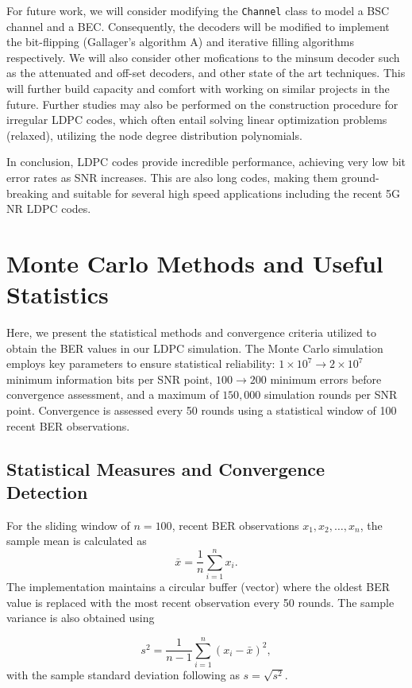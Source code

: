 \documentclass[12pt]{scrreprt}
\begin{document}
	For future work, we will consider modifying the \verb|Channel| class to model a BSC channel and a BEC. Consequently, the decoders will be modified to implement the bit-flipping (Gallager's algorithm A) and iterative filling algorithms respectively. We will also consider other mofications to the minsum decoder such as the attenuated and off-set decoders, and other state of the art techniques. This will further build capacity and comfort with working on similar projects in the future. Further studies may also be performed on the construction procedure for irregular LDPC codes, which often entail solving linear optimization problems (relaxed), utilizing the node degree distribution polynomials.
	
	In conclusion, LDPC codes provide incredible performance, achieving very low bit error rates as SNR increases. This are also long codes, making them ground-breaking and suitable for several high speed applications including the recent 5G NR LDPC codes.
	
		\appendix
		\chapter{Monte Carlo Methods and Useful Statistics}
		
		Here, we present the statistical methods and convergence criteria utilized to obtain the BER values in our LDPC simulation. The Monte Carlo simulation employs key parameters to ensure statistical reliability: $1 \times 10^7 \to 2\times 10^7$ minimum information bits per SNR point, $100 \to 200$ minimum errors before convergence assessment, and a maximum of $150,000$ simulation rounds per SNR point. Convergence is assessed every 50 rounds using a statistical window of 100 recent BER observations.
		
		\section*{Statistical Measures and Convergence Detection}
		
		For the sliding window of $n = 100$, recent BER observations $x_1, x_2, \ldots, x_n$, the sample mean is calculated as 
		\[ \bar{x} = \frac{1}{n} \sum_{i=1}^{n} x_i. \] 
		The implementation maintains a circular buffer (vector) where the oldest BER value is replaced with the most recent observation every 50 rounds. The sample variance is also obtained using 
		
		\[ s^2 = \frac{1}{n-1} \sum_{i=1}^{n} (x_i - \bar{x})^2, \] 
		with the sample standard deviation following as $s = \sqrt{s^2}$.
		
\end{document}
